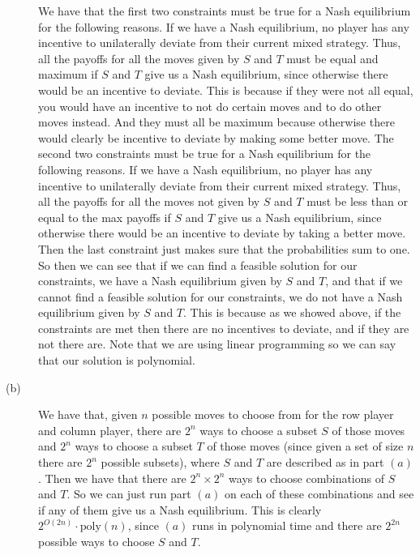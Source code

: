 \documentclass{article}
\begin{document}
\begin{description}
        We have that the first two constraints must be true for a Nash
        equilibrium for the following
        reasons. If we have a Nash equilibrium, no player has any incentive
        to unilaterally deviate from their current mixed strategy. Thus, all the
        payoffs for all the moves given by $S$ and $T$
        must be equal and maximum if $S$ and $T$ give
        us a Nash equilibrium, since otherwise there would be an incentive to
        deviate. This is because if they were not all equal, you would have an
        incentive to not do certain moves and to do other moves instead. And
        they must all be maximum because otherwise there would clearly be
        incentive to deviate by making some better move.
        The second two constraints must be true for a Nash equilibrium for the
        following reasons. If we have a Nash equilibrium, no player has any incentive
        to unilaterally deviate from their current mixed strategy. Thus, all the
        payoffs for all the moves not given by $S$ and $T$
        must be less than or equal to the max payoffs if $S$ and $T$ give
        us a Nash equilibrium, since otherwise there would be an incentive to deviate
        by taking a better move.
        Then the last constraint just makes sure that the probabilities sum to
        one. So then we can see that if we can find a feasible solution for our
        constraints, we have a Nash equilibrium given by $S$ and $T$, and that
        if we cannot find a feasible solution for our constraints, we do not
        have a Nash equilibrium given by $S$ and $T$. This is because as we
        showed above, if the constraints are met then there are no incentives to
        deviate, and if they are not there are.
        Note that we are using linear programming so we can say that our solution is
        polynomial.
    \item[(b)]
        We have that, given $n$ possible moves to choose from for the row player
        and column player, there are $2^n$
        ways to choose a subset $S$ of those moves and $2^n$ ways to choose a
        subset $T$ of those moves (since given a set of
        size $n$ there are $2^n$ possible subsets), where $S$ and $T$ are
        described as in part $(a)$. Then we have that there
        are $2^n \times 2^n$ ways to choose combinations of $S$ and $T$. So we
        can just run part $(a)$ on each of these combinations and see if any of
        them give us a Nash equilibrium. This is clearly $2^{O(2n)} \cdot
        \text{poly}(n)$, since $(a)$ runs in polynomial time and there are
        $2^{2n}$ possible ways to choose $S$ and $T$.
\end{description}
\newpage

\end{document}
